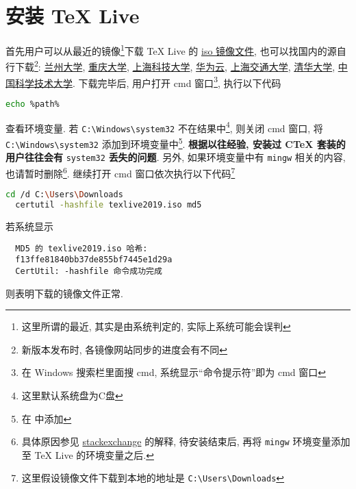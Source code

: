 \documentclass{ctexrep}
\begin{document}
\section{安装 \TeX{} Live}
首先用户可以从最近的镜像\footnote{这里所谓的最近, 其实是由系统判定的, 实际上系统可能会误判}下载 \TeX{} Live 的 \href{http://mirrors.ctan.org/systems/texlive/Images/texlive2019.iso}{iso 镜像文件},
也可以找国内的源自行下载\footnote{新版本发布时, 各镜像网站同步的进度会有不同}: \href{http://mirror.lzu.edu.cn/CTAN/systems/texlive/Images/texlive2019.iso}{兰州大学},
\href{http://mirrors.cqu.edu.cn/CTAN/systems/texlive/Images/texlive2019.iso}{重庆大学},
\href{http://mirrors-wan.geekpie.club/CTAN/systems/texlive/Images/texlive2019.iso}{上海科技大学},
\href{http://mirrors.huaweicloud.com/repository/toolkit/CTAN/systems/texlive/Images/texlive2019.iso}{华为云},
\href{http://mirrors.sjtug.sjtu.edu.cn/ctan/systems/texlive/Images/texlive2019.iso}{上海交通大学},
\href{http://mirrors.tuna.tsinghua.edu.cn/CTAN/systems/texlive/Images/texlive2019.iso}{清华大学},
\href{http://mirrors.ustc.edu.cn/CTAN/systems/texlive/Images/texlive2019.iso}{中国科学技术大学}.
下载完毕后, 用户打开 \textsf{cmd} 窗口\footnote{在 Windows 搜索栏里面搜 cmd, 系统显示“命令提示符”即为 \textsf{cmd} 窗口}, 执行以下代码
\begin{lstlisting}[language = bash]
  echo %path%
\end{lstlisting}
查看环境变量. 
若 \texttt{C:\textbackslash Windows\textbackslash system32} 不在结果中\footnote{这里默认系统盘为\textsf{C}盘}, 则关闭 \textsf{cmd} 窗口, 将 \texttt{C:\textbackslash Windows\textbackslash system32} 添加到环境变量中\footnote{在  中添加}.
\textbf{根据以往经验, 安装过 CTeX 套装的用户往往会有} \texttt{system32} \textbf{丢失的问题}. 
另外, 如果环境变量中有 \texttt{mingw} 相关的内容, 也请暂时删除\footnote{具体原因参见 \href{https://tex.stackexchange.com/questions/445086/error-installing-latest-version-of-tex-live-on-windows-10}{stackexchange} 的解释, 待安装结束后, 再将 \texttt{mingw} 环境变量添加至 \TeX{} Live 的环境变量之后.}.
继续打开 \textsf{cmd} 窗口依次执行以下代码\footnote{这里假设镜像文件下载到本地的地址是 \texttt{C:\textbackslash Users\textbackslash Downloads}}
\begin{lstlisting}[language = bash]
  cd /d C:\Users\Downloads
  certutil -hashfile texlive2019.iso md5
\end{lstlisting}
若系统显示
\begin{lstlisting}
  MD5 的 texlive2019.iso 哈希:
  f13ffe81840bb37de855bf7445e1d29a
  CertUtil: -hashfile 命令成功完成
\end{lstlisting}
则表明下载的镜像文件正常.
\end{document}
